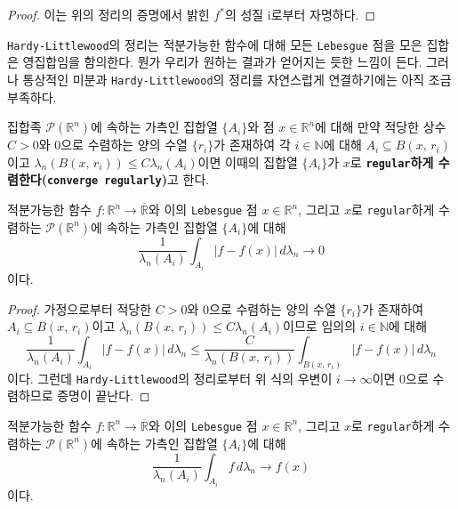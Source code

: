 \begin{proof}
    이는 위의 정리의 증명에서 밝힌 $f^*$의 성질 i로부터 자명하다.
\end{proof}

\texttt{Hardy-Littlewood}의 정리는 적분가능한 함수에 대해 모든 \texttt{Lebesgue} 점을 모은 집합은 영집합임을 함의한다. 뭔가 우리가 원하는 결과가 얻어지는 듯한 느낌이 든다. 그러나 통상적인 미분과 \texttt{Hardy-Littlewood}의 정리를 자연스럽게 연결하기에는 아직 조금 부족하다.

\begin{definition}
    집합족 $\mathcal{P}(\mathbb{R}^n)$에 속하는 가측인 집합열 $\{A_i\}$와 점 $x\in\mathbb{R}^n$에 대해 만약 적당한 상수 $C>0$와 $0$으로 수렴하는 양의 수열 $\{r_i\}$가 존재하여 각 $i\in\mathbb{N}$에 대해 $A_i\subseteq B(x,\,r_i)$이고 $\lambda_n(B(x,\,r_i))\leq C\lambda_n(A_i)$이면 이때의 집합열 $\{A_i\}$가 $x$로 \textbf{\texttt{regular}하게 수렴한다(\texttt{converge regularly})}고 한다.
\end{definition}

\begin{theorem}
    적분가능한 함수 $f:\mathbb{R}^n\to\overline{\mathbb{R}}$와 이의 \texttt{Lebesgue} 점 $x\in\mathbb{R}^n$, 그리고 $x$로 \texttt{regular}하게 수렴하는 $\mathcal{P}(\mathbb{R}^n)$에 속하는 가측인 집합열 $\{A_i\}$에 대해
    \begin{equation*}
        \frac{1}{\lambda_n(A_i)}\int_{A_i}|f-f(x)|\,d\lambda_n\to0
    \end{equation*}
    이다.
\end{theorem}

\begin{proof}
    가정으로부터 적당한 $C>0$와 $0$으로 수렴하는 양의 수열 $\{r_i\}$가 존재하여 $A_i\subseteq B(x,\,r_i)$이고 $\lambda_n(B(x,\,r_i))\leq C\lambda_n(A_i)$이므로 임의의 $i\in\mathbb{N}$에 대해
    \begin{equation*}
        \frac{1}{\lambda_n(A_i)}\int_{A_i}|f-f(x)|\,d\lambda_n\leq\frac{C}{\lambda_n(B(x,\,r_i))}\int_{B(x,\,r_i)}|f-f(x)|\,d\lambda_n
    \end{equation*}
    이다. 그런데 \texttt{Hardy-Littlewood}의 정리로부터 위 식의 우변이 $i\to\infty$이면 $0$으로 수렴하므로 증명이 끝난다.
\end{proof}

\begin{corollary}\label{cor:regularConverge}
    적분가능한 함수 $f:\mathbb{R}^n\to\overline{\mathbb{R}}$와 이의 \texttt{Lebesgue} 점 $x\in\mathbb{R}^n$, 그리고 $x$로 \texttt{regular}하게 수렴하는 $\mathcal{P}(\mathbb{R}^n)$에 속하는 가측인 집합열 $\{A_i\}$에 대해
    \begin{equation*}
        \frac{1}{\lambda_n(A_i)}\int_{A_i}f\,d\lambda_n\to f(x)
    \end{equation*}
    이다.
\end{corollary}


